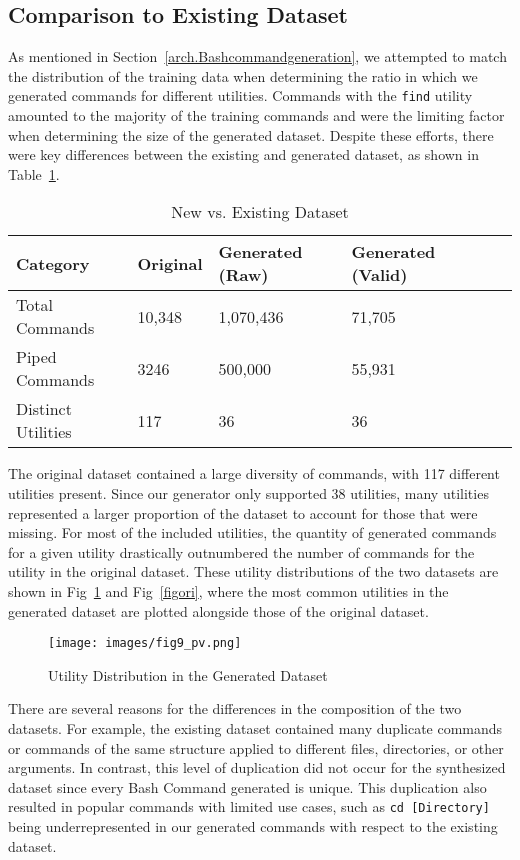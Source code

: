 \documentclass{river-journal}
\begin{document}
\subsection{Comparison to Existing Dataset} 

As mentioned in Section~\ref{arch.Bashcommandgeneration}, we attempted to match the distribution of the training data when determining the ratio in which we generated commands for different utilities. Commands with the \texttt{find} utility amounted to the majority of the training commands and were the limiting factor when determining the size of the generated dataset. Despite these efforts, there were key differences between the existing and generated dataset, as shown in Table~\ref{table:leaderboard2}.
\begin{table}[bhtp]
\caption{\label{table:leaderboard2} New vs. Existing Dataset}
\centering
\begin{tabular}{llllll}
\hline \textbf{Category} & \textbf{Original} & \textbf{Generated (Raw)} &\textbf{Generated (Valid)}
\\\hline
Total Commands & 10,348 & 1,070,436 & 71,705 \\
Piped Commands & 3246 & 500,000 & 55,931 \\
Distinct Utilities & 117 & 36 & 36 \\
\hline
\end{tabular}
\end{table}

The original dataset contained a large diversity of commands, with 117 different utilities present. Since our generator only supported 38 utilities, many utilities represented a larger proportion of the dataset to account for those that were missing. For most of the included utilities, the quantity of generated commands for a given utility drastically outnumbered the number of commands for the utility in the original dataset. These utility distributions of the two datasets are shown in Fig~\ref{fignew} and Fig~\ref{figori}, where the most common utilities in the generated dataset are plotted alongside those of the original dataset.
\begin{figure}[hbpt]
\centering
\texttt{[image: images/fig9\_pv.png]}
\caption{Utility Distribution in the Generated Dataset}
\label{fignew}
\end{figure}

There are several reasons for the differences in the composition of the two datasets. For example, the existing dataset contained many duplicate commands or commands of the same structure applied to different files, directories, or other arguments. In contrast, this level of duplication did not occur for the synthesized dataset since every Bash Command generated is unique. This duplication also resulted in popular commands with limited use cases, such as \texttt{cd [Directory]} being underrepresented in our generated commands with respect to the existing dataset. 
\end{document}
